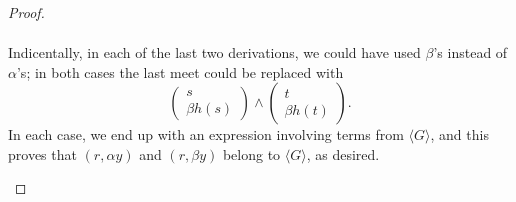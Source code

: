 \begin{proof}
\begin{itemize}
\begin{align*}
\end{align*}
Indicentally, in each of the last two derivations, we could have used $\beta$'s 
instead of $\alpha$'s; in both cases the last meet could be replaced with
\[
\left(\begin{array}{c}s \\ \beta {h(s)}\end{array}\right) \wedge \left(\begin{array}{c}t \\ \beta {h(t)} \end{array}\right).
\]
In each case, we end up with an expression involving terms from $\langle G \rangle$, 
and this proves that $(r, \alpha y)$ and $(r, \beta y)$ belong to $\langle G \rangle$, as desired.
\end{itemize}
\end{proof}











































  \appendix

